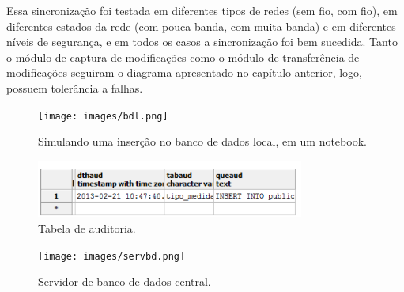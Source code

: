 Essa sincronização foi testada em diferentes tipos de redes (sem fio, com fio), em diferentes estados da rede (com pouca banda, com muita banda) e em diferentes níveis de segurança, e em todos os casos a sincronização foi bem sucedida. Tanto o módulo de captura de modificações como o módulo de transferência de modificações seguiram o diagrama apresentado no capítulo anterior, logo, possuem tolerância a falhas.

\begin{figure}[ht]
\centering
\texttt{[image: images/bdl.png]}
\caption{Simulando uma inserção no banco de dados local, em um notebook.}
\label{fig:bdl}
\end{figure}

\begin{figure}[ht]
\centering
\includegraphics[width=250pt]{images/auditoria.png}
\caption{Tabela de auditoria.}
\label{fig:auditoria}
\end{figure}

\begin{figure}[ht]
\centering
\texttt{[image: images/servbd.png]}
\caption{Servidor de banco de dados central.}
\label{fig:servbd}
\end{figure}
